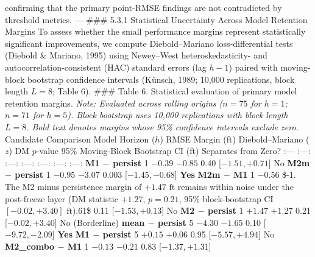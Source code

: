 \documentclass[11pt]{article}
\begin{document}
confirming that the primary point-RMSE findings are not contradicted by
threshold metrics. --- \#\#\# 5.3.1 Statistical Uncertainty Across Model
Retention Margins To assess whether the small performance margins
represent statistically significant improvements, we compute
Diebold--Mariano loss-differential tests (Diebold \& Mariano, 1995)
using Newey--West heteroskedasticity- and autocorrelation-consistent
(HAC) standard errors (lag \(h-1\)) paired with moving-block bootstrap
confidence intervals (Künsch, 1989; 10,000 replications, block length
\(L = 8\); Table 6). \#\#\# Table 6. Statistical evaluation of primary
model retention margins. \emph{Note: Evaluated across rolling origins
(\(n=75\) for \(h=1\); \(n=71\) for \(h=5\)). Block bootstrap uses
10,000 replications with block length \(L=8\). Bold text denotes margins
whose 95\% confidence intervals exclude zero.} \textbar{} Candidate
Comparison Model \textbar{} Horizon (\(h\)) \textbar{} RMSE Margin (ft)
\textbar{} Diebold--Mariano (\(z\)) \textbar{} DM \(p\)-value \textbar{}
95\% Moving-Block Bootstrap CI (ft) \textbar{} Separates from Zero?
\textbar{} \textbar{} :--- \textbar{} :---: \textbar{} :---: \textbar{}
:---: \textbar{} :---: \textbar{} :---: \textbar{} :---: \textbar{}
\textbar{} \textbf{M1 \(-\) persist} \textbar{} 1 \textbar{} \(-0.39\)
\textbar{} \(-0.85\) \textbar{} 0.40 \textbar{} {[}\(-1.51, +0.71\){]}
\textbar{} No \textbar{} \textbar{} \textbf{M2m \(-\) persist}
\textbar{} 1 \textbar{} \(-0.95\) \textbar{} \(-3.07\) \textbar{} 0.003
\textbar{} {[}\textbf{\(-1.45, -0.68\)}{]} \textbar{} \textbf{Yes}
\textbar{} \textbar{} \textbf{M2m \(-\) M1} \textbar{} 1 \textbar{}
\(-0.56\) \textbar{} \$-1. The M2 minus persistence margin of
\(+1.47\text{ ft}\) remains within noise under the post-freeze layer (DM
statistic \(+1.27\), \(p = 0.21\), 95\% block-bootstrap CI
\([-0.02, +3.40]\text{ ft}\)).61\$ \textbar{} 0.11 \textbar{}
{[}\(-1.53, +0.13\){]} \textbar{} No \textbar{} \textbar{} \textbf{M2
\(-\) persist} \textbar{} 1 \textbar{} \(+1.47\) \textbar{} \(+1.27\)
\textbar{} 0.21 \textbar{} {[}\(-0.02, +3.40\){]} \textbar{} No
(Borderline) \textbar{} \textbar{} \textbf{mean \(-\) persist}
\textbar{} 5 \textbar{} \(-4.30\) \textbar{} \(-1.65\) \textbar{} 0.10
\textbar{} {[}\textbf{\(-9.72, -2.09\)}{]} \textbar{} \textbf{Yes}
\textbar{} \textbar{} \textbf{M1 \(-\) persist} \textbar{} 5 \textbar{}
\(+0.15\) \textbar{} \(+0.06\) \textbar{} 0.95 \textbar{}
{[}\(-5.57, +4.94\){]} \textbar{} No \textbar{} \textbar{}
\textbf{M2\_combo \(-\) M1} \textbar{} 1 \textbar{} \(-0.13\) \textbar{}
\(-0.21\) \textbar{} 0.83 \textbar{} {[}\(-1.37, +1.31\){]} \textbar{}
\end{document}
